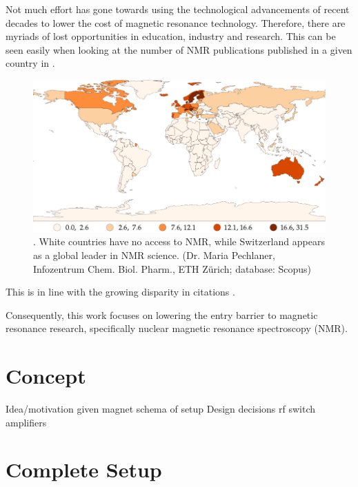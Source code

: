 Not much effort has gone towards using the technological advancements of recent decades to lower the cost of magnetic resonance technology. Therefore, there are myriads of lost opportunities in education, industry and research. This can be seen easily when looking at the number of NMR publications published in a given country in .
\begin{figure}[h!bt]
    \centering
    \includegraphics{data/nmr_citations/nmr-affiliations-per-million-people_naturalbreaks.pdf}
    \caption{. White countries have no access to NMR, while Switzerland appears as a global leader in NMR science. (Dr. Maria Pechlaner, Infozentrum Chem. Biol. Pharm., ETH Zürich; database: Scopus)}
\end{figure}
This is in line with the growing disparity in citations .

Consequently, this work focuses on lowering the entry barrier to magnetic resonance research, specifically nuclear magnetic resonance spectroscopy (NMR).





\section{Concept}
Idea/motivation
given magnet
schema of setup
Design decisions
rf switch
amplifiers

\section{Complete Setup}

